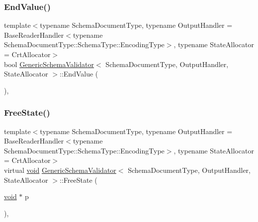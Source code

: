 \mbox{\label{classGenericSchemaValidator_ae78fc24af2c112de5d7651f0755257db}} 
\subsubsection{\texorpdfstring{End\+Value()}{EndValue()}}
{\footnotesize\ttfamily template$<$typename Schema\+Document\+Type, typename Output\+Handler = Base\+Reader\+Handler$<$typename Schema\+Document\+Type\+::\+Schema\+Type\+::\+Encoding\+Type$>$, typename State\+Allocator = Crt\+Allocator$>$ \\
bool \hyperlink{classGenericSchemaValidator}{Generic\+Schema\+Validator}$<$ Schema\+Document\+Type, Output\+Handler, State\+Allocator $>$\+::End\+Value (\begin{DoxyParamCaption}{ }\end{DoxyParamCaption})\hspace{0.3cm}{\ttfamily [inline]}, {\ttfamily [private]}}

\mbox{\label{classGenericSchemaValidator_a4e250737a411af2969a9e585a7da4187}} 
\subsubsection{\texorpdfstring{Free\+State()}{FreeState()}}
{\footnotesize\ttfamily template$<$typename Schema\+Document\+Type, typename Output\+Handler = Base\+Reader\+Handler$<$typename Schema\+Document\+Type\+::\+Schema\+Type\+::\+Encoding\+Type$>$, typename State\+Allocator = Crt\+Allocator$>$ \\
virtual \hyperlink{imgui__impl__opengl3__loader_8h_ac668e7cffd9e2e9cfee428b9b2f34fa7}{void} \hyperlink{classGenericSchemaValidator}{Generic\+Schema\+Validator}$<$ Schema\+Document\+Type, Output\+Handler, State\+Allocator $>$\+::Free\+State (\begin{DoxyParamCaption}\item[{\hyperlink{imgui__impl__opengl3__loader_8h_ac668e7cffd9e2e9cfee428b9b2f34fa7}{void} $\ast$}]{p }\end{DoxyParamCaption})\hspace{0.3cm}{\ttfamily [inline]}, {\ttfamily [virtual]}}



